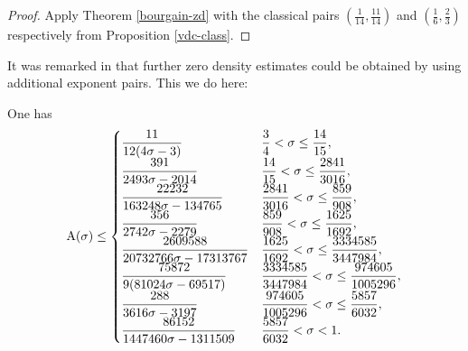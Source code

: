 \literature
{}

\begin{proof} Apply Theorem \ref{bourgain-zd} with the classical pairs $(\frac{1}{14},\frac{11}{14})$ and $(\frac{1}{6}, \frac{2}{3})$ respectively from Proposition \ref{vdc-class}.
\end{proof}

It was remarked in \cite{bourgain_remarks_1995} that further zero density estimates could be obtained by using additional exponent pairs.  This we do here:

\begin{corollary}\label{bourgain-zero-density-optimized} One has
\[
\mathrm{A}(\sigma) \leq \begin{cases}
\dfrac{11}{12(4 \sigma - 3)} & \dfrac{3}{4} < \sigma \le \dfrac{14}{15},\\
\dfrac{391}{2493 \sigma - 2014} & \dfrac{14}{15} < \sigma \le \dfrac{2841}{3016},\\
\dfrac{22232}{163248 \sigma - 134765} & \dfrac{2841}{3016} < \sigma \le \dfrac{859}{908},\\
\dfrac{356}{2742 \sigma - 2279} & \dfrac{859}{908} < \sigma \le \dfrac{1625}{1692},\\
\dfrac{2609588}{20732766\sigma - 17313767} & \dfrac{1625}{1692} < \sigma \le \dfrac{3334585}{3447984},\\
\dfrac{75872}{9 (81024 \sigma - 69517)} & \dfrac{3334585}{3447984} < \sigma \le \dfrac{974605}{1005296},\\
\dfrac{288}{3616 \sigma - 3197} & \dfrac{974605}{1005296} < \sigma \le \dfrac{5857}{6032},\\
\dfrac{86152}{1447460 \sigma - 1311509} & \dfrac{5857}{6032} < \sigma < 1.
\end{cases}
\]
\end{corollary}


